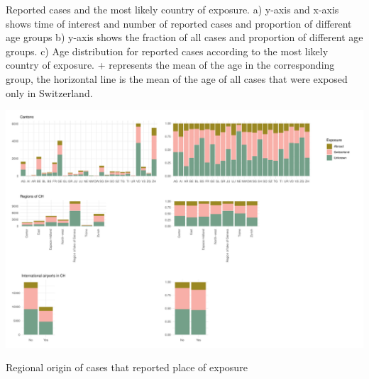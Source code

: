 \documentclass[10pt, a4paper, twoside]{article}
\begin{document}
\begin{suppfigure}[h]
\caption{Reported cases and the most likely country of exposure. a) y-axis and x-axis shows time of interest and number of reported cases and proportion of different age groups b) y-axis shows the fraction of all cases and proportion of different age groups. c) Age distribution for reported cases according to the most likely country of exposure. + represents the mean of the age in the corresponding group, the horizontal line is the mean of the age of all cases that were exposed only in Switzerland.}
\label{sf3}
\end{suppfigure}


\clearpage
\begin{suppfigure}[h]
\centering
\includegraphics[scale=0.4]{SF4_2021-04-09.pdf}
\caption{Regional origin of cases that reported place of exposure}
\label{sf4}
\end{suppfigure}
\end{document}
